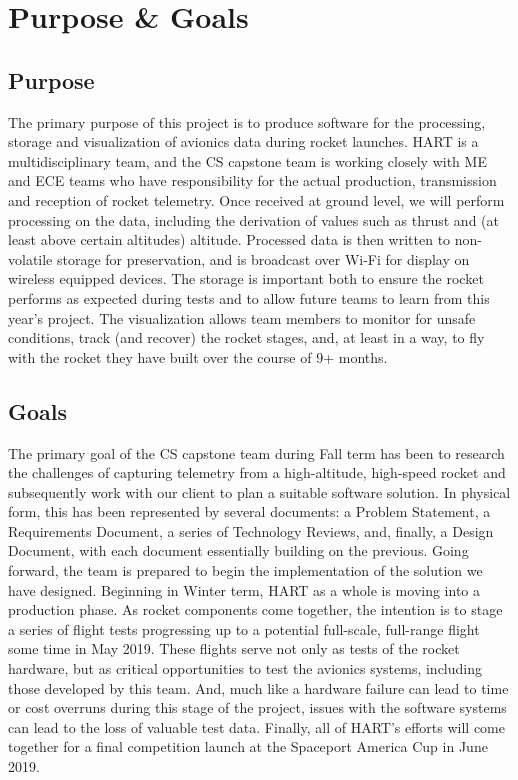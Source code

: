\documentclass[journal,10pt,onecolumn,compsoc]{IEEEtran}
\begin{document}

\section{Purpose \& Goals}

	\subsection{Purpose}
		\noindent The primary purpose of this project is to produce software for the processing, storage and visualization of avionics data during rocket launches.
		HART is a multidisciplinary team, and the CS capstone team is working closely with ME and ECE teams who have responsibility for the actual production, transmission and reception of rocket telemetry.
		Once received at ground level, we will perform processing on the data, including the derivation of values such as thrust and (at least above certain altitudes) altitude.
		Processed data is then written to non-volatile storage for preservation, and is broadcast over Wi-Fi for display on wireless equipped devices.
		The storage is important both to ensure the rocket performs as expected during tests and to allow future teams to learn from this year's project.
		The visualization allows team members to monitor for unsafe conditions, track (and recover) the rocket stages, and, at least in a way, to fly with the rocket they have built over the course of 9+ months.
	
	\subsection{Goals}
		\noindent The primary goal of the CS capstone team during Fall term has been to research the challenges of capturing telemetry from a high-altitude, high-speed rocket and subsequently work with our client to plan a suitable software solution.
		In physical form, this has been represented by several documents: a Problem Statement, a Requirements Document, a series of Technology Reviews, and, finally, a Design Document, with each document essentially building on the previous.
		Going forward, the team is prepared to begin the implementation of the solution we have designed.
		Beginning in Winter term, HART as a whole is moving into a production phase.
		As rocket components come together, the intention is to stage a series of flight tests progressing up to a potential full-scale, full-range flight some time in May 2019.
		These flights serve not only as tests of the rocket hardware, but as critical opportunities to test the avionics systems, including those developed by this team.
		And, much like a hardware failure can lead to time or cost overruns during this stage of the project, issues with the software systems can lead to the loss of valuable test data.
		Finally, all of HART's efforts will come together for a final competition launch at the Spaceport America Cup in June 2019.
\newpage
\end{document}
